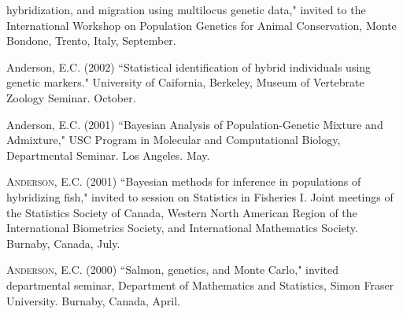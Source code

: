\documentclass[11pt]{article}
\begin{document}
\begin{description}
hybridization, and migration using multilocus genetic data," invited to the International Workshop on
Population Genetics for Animal Conservation, Monte Bondone, Trento, Italy, September.
\item[] {\sc Anderson, E.C.} (2002) ``Statistical identification of hybrid individuals using genetic markers." University of Caifornia, Berkeley, Museum of Vertebrate Zoology Seminar.  October.
\item[] {\sc Anderson, E.C.} (2001) ``Bayesian Analysis of Population-Genetic Mixture and Admixture," USC Program in Molecular and Computational Biology, Departmental Seminar. Los Angeles. May.
\item[] \textsc{Anderson, E.C.} (2001) ``Bayesian methods for inference in
populations of hybridizing fish," invited to session on Statistics in
Fisheries I. Joint meetings of the Statistics Society of Canada, Western
North American Region of the International Biometrics Society, and
International Mathematics Society. Burnaby, Canada, July.
\item[] \textsc{Anderson, E.C.} (2000) ``Salmon, genetics, and Monte Carlo," invited departmental
seminar, Department of Mathematics and Statistics, Simon Fraser University. Burnaby, Canada, April.
\end{description}
\end{document}
